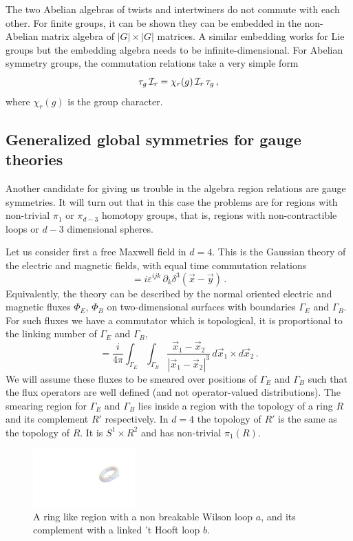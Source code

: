 \documentclass[11pt]{article}
\numberwithin{equation}{section}
\newcommand{\be}{\begin{equation}}
\newcommand{\ee}{\end{equation}}
\begin{document}
The two Abelian algebras of twists and intertwiners do not commute with each other. For finite groups, it can be shown they can be embedded in the non-Abelian matrix algebra of $|G|\times |G|$ matrices. A similar embedding works for Lie groups but the embedding algebra needs to be infinite-dimensional. For Abelian symmetry groups, the commutation relations take a very simple form
\be\label{ccrel}
\tau_g \, {\cal I}_r = \chi_r(g) \, {\cal I}_r \, \tau_g\,,  
\ee 
where $\chi_r(g)$ is the group character. 



\subsection{Generalized global symmetries for gauge theories}

Another candidate for giving us trouble in the algebra region relations are gauge symmetries. It will turn out that in this case the problems are for regions with non-trivial $\pi_1$ or $\pi_{d-3}$ homotopy groups, that is, regions with non-contractible loops or $d-3$ dimensional spheres. 

Let us consider first a free Maxwell field in $d=4$.  This is the Gaussian theory of the electric and magnetic fields, with equal time commutation relations
\be
[E^i(\vec{x}),B^j(\vec{y})]=i \varepsilon^{ijk}\, \partial_k \delta^3(\vec{x}-\vec{y})\,.
\ee
Equivalently, the theory can be described by the normal oriented electric and magnetic fluxes $\Phi_E$, $\Phi_B$ on two-dimensional surfaces with boundaries $\Gamma_E$ and $\Gamma_B$.  For such fluxes we have a commutator which is topological, it is proportional to the linking number of $\Gamma_E$ and $\Gamma_B$,
\be
[\Phi_E,\Phi_B]=\frac{i}{4\pi}\int_{\Gamma_E}\int_{\Gamma_B} \frac{\vec{x}_1-\vec{x}_2}{|\vec{x}_1-\vec{x}_2|^3}\, d\vec{x}_1\times d\vec{x}_2  \,.\label{deci}
\ee  
We will assume these fluxes to be smeared over positions of $\Gamma_E$ and $\Gamma_B$ such that the flux operators are well defined (and not operator-valued distributions). The smearing region for $\Gamma_E$ and $\Gamma_B$ lies inside a region with the topology of a ring $R$ and its complement $R'$ respectively. In $d=4$ the topology of $R'$ is the same as the topology of $R$. It is $S^1\times R^2$ and has non-trivial $\pi_1(R)$. 

\begin{figure}[t]
\begin{center}  
\includegraphics[width=0.35\textwidth]{toro.pdf}
\captionsetup{width=0.9\textwidth}
\caption{A ring like region with a non breakable Wilson loop $a$, and its complement with a linked  't Hooft loop $b$.}
\label{toro}
\end{center}  
\end{figure}  
\end{document}
